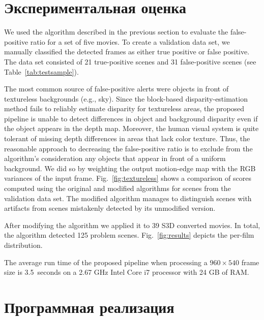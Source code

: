 \documentclass[14pt, a4paper]{extarticle}
\begin{document}



\newpage
\section{Экспериментальная оценка}

We used the algorithm described in the previous section to evaluate the false-positive ratio for 
a set of five movies. To create a validation data set, we manually classified  the detected frames 
as either true positive or false positive. The data set consisted of 21 true-positive scenes and 
31 false-positive scenes (see Table~\ref{tab:testsample}).



The most common source of false-positive alerts were objects in front of textureless 
backgrounds (e.g., sky). Since the block-based disparity-estimation method fails 
to reliably estimate disparity for textureless areas, the proposed pipeline is unable to detect 
differences in object and background disparity even if the object appears in the depth map. 
Moreover, the human visual system is quite tolerant of missing depth differences in areas 
that lack color texture. Thus, the reasonable approach to decreasing the false-positive ratio
is to exclude from the algorithm's consideration any objects that appear in front of a uniform background.
We did so by weighting the output motion-edge map with the RGB variances of the input 
frame. Fig.~\ref{fig:textureless} shows  a comparison of  scores computed using the original 
and modified algorithms for scenes from the validation data set. The modified
algorithm manages to distinguish scenes with artifacts from scenes mistakenly detected
by its unmodified version.



After modifying the algorithm we applied it to 39 S3D converted movies. In total,
the algorithm detected 125 problem scenes. Fig.~\ref{fig:results} depicts the per-film distribution.

The average run time of the proposed pipeline when processing a $960\times540$ frame size is 
3.5~seconds on a 2.67 GHz Intel Core i7 processor with 24 GB of RAM.



\newpage
\section{Программная реализация}
\end{document}
